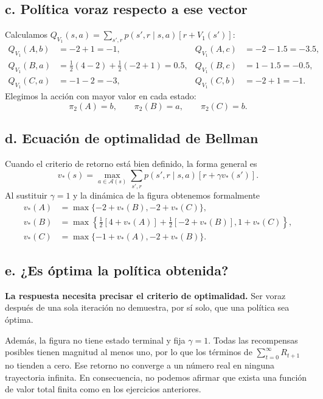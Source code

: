 \documentclass[11pt,a4paper]{article}
\newcommand{\apartado}[1]{\subsection*{#1}}
\begin{document}
\apartado{c. Política voraz respecto a ese vector}
Calculamos $Q_{V_1}(s,a)=\sum_{s',r}p(s',r\mid s,a)[r+V_1(s')]$:
\begin{align*}
Q_{V_1}(A,b)&=-2+1=-1,&
Q_{V_1}(A,c)&=-2-1.5=-3.5,\\
Q_{V_1}(B,a)&=\tfrac12(4-2)+\tfrac12(-2+1)=0.5,&
Q_{V_1}(B,c)&=1-1.5=-0.5,\\
Q_{V_1}(C,a)&=-1-2=-3,&
Q_{V_1}(C,b)&=-2+1=-1.
\end{align*}
Elegimos la acción con mayor valor en cada estado:
\[
\boxed{\pi_2(A)=b,\qquad \pi_2(B)=a,\qquad \pi_2(C)=b.}
\]

\apartado{d. Ecuación de optimalidad de Bellman}
Cuando el criterio de retorno está bien definido, la forma general es
\[
v_*(s)=\max_{a\in\mathcal A(s)}\sum_{s',r}p(s',r\mid s,a)
[r+\gamma v_*(s')].
\]
Al sustituir $\gamma=1$ y la dinámica de la figura obtenemos formalmente
\begin{align*}
v_*(A)&=\max\{-2+v_*(B),-2+v_*(C)\},\\
v_*(B)&=\max\left\{\tfrac12[4+v_*(A)]+\tfrac12[-2+v_*(B)],1+v_*(C)\right\},\\
v_*(C)&=\max\{-1+v_*(A),-2+v_*(B)\}.
\end{align*}

\apartado{e. ¿Es óptima la política obtenida?}
\textbf{La respuesta necesita precisar el criterio de optimalidad.} Ser voraz después de una sola iteración no demuestra, por sí solo, que una política sea óptima.

Además, la figura no tiene estado terminal y fija $\gamma=1$. Todas las recompensas posibles tienen magnitud al menos uno, por lo que los términos de $\sum_{t=0}^\infty R_{t+1}$ no tienden a cero. Ese retorno no converge a un número real en ninguna trayectoria infinita. En consecuencia, no podemos afirmar que exista una función de valor total finita como en los ejercicios anteriores.
\end{document}
